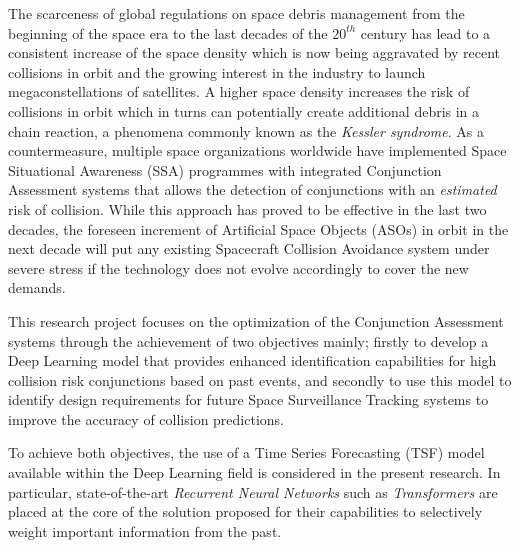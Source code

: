 


The scarceness of global regulations on space debris management from the beginning of the space era to the last decades of the $20^{th}$ century has lead to a consistent increase of the space density which is now being aggravated by recent collisions in orbit and the growing interest in the industry to launch megaconstellations of satellites. A higher space density increases the risk of collisions in orbit which in turns can potentially create additional debris in a chain reaction, a phenomena commonly known as the \textit{Kessler syndrome}. As a countermeasure, multiple space organizations worldwide have implemented Space Situational Awareness (SSA) programmes with integrated Conjunction Assessment systems that allows the detection of conjunctions with an \textit{estimated} risk of collision. While this approach has proved to be effective in the last two decades, the foreseen increment of Artificial Space Objects (ASOs) in orbit in the next decade will put any existing Spacecraft Collision Avoidance system under severe stress if the technology does not evolve accordingly to cover the new demands.

This research project focuses on the optimization of the Conjunction Assessment systems through the achievement of two objectives mainly; firstly to develop a Deep Learning model that provides enhanced identification capabilities for high collision risk conjunctions based on past events, and secondly to use this model to identify design requirements for future Space Surveillance Tracking systems to improve the accuracy of collision predictions.  

To achieve both objectives, the use of a Time Series Forecasting (TSF) model available within the Deep Learning field is considered in the present research. In particular, state-of-the-art \textit{Recurrent Neural Networks} such as \textit{Transformers} are placed at the core of the solution proposed for their capabilities to selectively weight important information from the past. 

